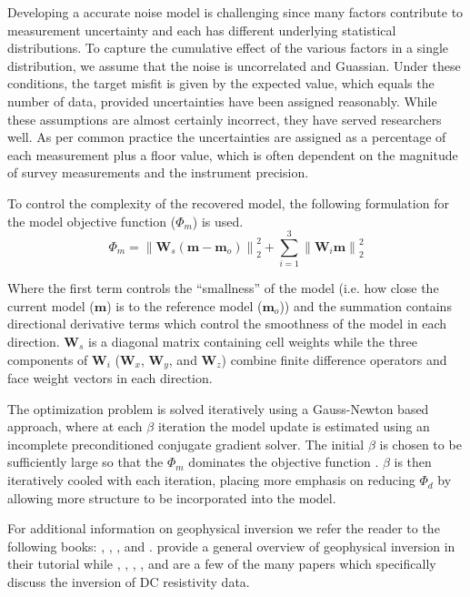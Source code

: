 \documentclass[final,authoryear,5p,times,twocolumn]{elsarticle}
\begin{document}
Developing a accurate noise model is challenging since many factors contribute to measurement uncertainty and each has different underlying statistical distributions. To capture the cumulative effect of the various factors in a single distribution, we assume that the noise is uncorrelated and Guassian. Under these conditions, the target misfit is given by the expected value, which equals the number of data, provided uncertainties have been assigned reasonably. While these assumptions are almost certainly incorrect, they have served researchers well. As per common practice the uncertainties are assigned as a percentage of each measurement plus a floor value, which is often dependent on the magnitude of survey measurements and the instrument precision.

To control the complexity of the recovered model, the following formulation for the model objective function ($\Phi_{m}$) is used.
\begin{equation}
\label{eq:modobjdiscr}
\Phi_m = \left\|\mathbf{W}_s(\mathbf{m}-\mathbf{m}_o)\right\|_2^2 + \sum^{3}_{i=1}\left\|\mathbf{W}_i\mathbf{m}\right\|_2^2
\end{equation}

Where the first term controls the ``smallness'' of the model (i.e. how close the current model ($\mathbf{m}$) is to the reference model ($\mathbf{m}_o$)) and the summation contains directional derivative terms which control the smoothness of the model in each direction. $\mathbf{W}_s$ is a diagonal matrix containing cell weights while the three components of $\mathbf{W}_i$ ($\mathbf{W}_x$, $\mathbf{W}_y$, and $\mathbf{W}_z$) combine finite difference operators and face weight vectors in each direction.

The optimization problem is solved iteratively using a Gauss-Newton based approach, where at each $\beta$ iteration the model update is estimated using an incomplete preconditioned conjugate gradient solver. The initial $\beta$ is chosen to be sufficiently large so that the $\Phi_m$ dominates the objective function \citep{Haber2004}.  $\beta$ is then iteratively cooled with each iteration, placing more emphasis on reducing $\Phi_d$ by allowing more structure to be incorporated into the model.

For additional information on geophysical inversion we refer the reader to the following books: \cite{Menke1989}, \cite{Parker1994}, \cite{Aster2012}, and \cite{Haber2014}. \cite{Oldenburg2005} provide a general overview of geophysical inversion in their tutorial while \cite{Li1994}, \cite{LaBrecque1996}, \cite{Loke1996}, \cite{Ramirez1996}, and \cite{Loke2013} are a few of the many papers which specifically discuss the inversion of DC resistivity data.
\end{document}
